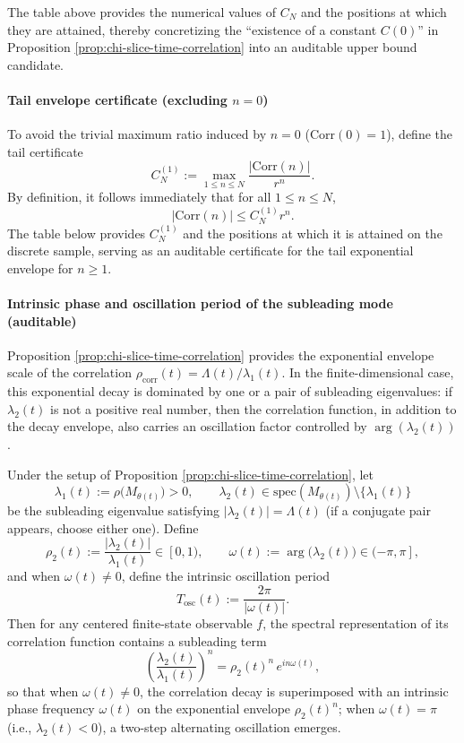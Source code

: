 \label{subsec:chi-ldp-part2}


The table above provides the numerical values of $C_N$ and the positions at which they are attained, thereby concretizing the ``existence of a constant $C(0)$'' in Proposition \ref{prop:chi-slice-time-correlation} into an auditable upper bound candidate.

\paragraph{Tail envelope certificate (excluding $n=0$)}
To avoid the trivial maximum ratio induced by $n=0$ ($\mathrm{Corr}(0)=1$), define the tail certificate
\[
C_N^{(1)}:=\max_{1\le n\le N}\frac{|\mathrm{Corr}(n)|}{r^n}.
\]
By definition, it follows immediately that for all $1\le n\le N$,
\[
|\mathrm{Corr}(n)|\le C_N^{(1)} r^n.
\]
The table below provides $C_N^{(1)}$ and the positions at which it is attained on the discrete sample, serving as an auditable certificate for the tail exponential envelope for $n\ge 1$.


\paragraph{Intrinsic phase and oscillation period of the subleading mode (auditable)}
Proposition \ref{prop:chi-slice-time-correlation} provides the exponential envelope scale of the correlation $\rho_{\mathrm{corr}}(t)=\Lambda(t)/\lambda_1(t)$. In the finite-dimensional case, this exponential decay is dominated by one or a pair of subleading eigenvalues: if $\lambda_2(t)$ is not a positive real number, then the correlation function, in addition to the decay envelope, also carries an oscillation factor controlled by $\arg(\lambda_2(t))$.

\begin{remark}
\label{prop:chi-slice-subleading-phase}
Under the setup of Proposition \ref{prop:chi-slice-time-correlation}, let
\[
\lambda_1(t):=\rho\bigl(M_{\theta(t)}\bigr)>0,
\qquad
\lambda_2(t)\in\mathrm{spec}(M_{\theta(t)})\setminus\{\lambda_1(t)\}
\]
be the subleading eigenvalue satisfying $|\lambda_2(t)|=\Lambda(t)$ (if a conjugate pair appears, choose either one). Define
\[
\rho_2(t):=\frac{|\lambda_2(t)|}{\lambda_1(t)}\in[0,1),
\qquad
\omega(t):=\arg\bigl(\lambda_2(t)\bigr)\in(-\pi,\pi],
\]
and when $\omega(t)\ne 0$, define the intrinsic oscillation period
\[
T_{\mathrm{osc}}(t):=\frac{2\pi}{|\omega(t)|}.
\]
Then for any centered finite-state observable $f$, the spectral representation of its correlation function contains a subleading term
\[
\left(\frac{\lambda_2(t)}{\lambda_1(t)}\right)^n
=\rho_2(t)^n\,e^{i n\omega(t)},
\]
so that when $\omega(t)\ne 0$, the correlation decay is superimposed with an intrinsic phase frequency $\omega(t)$ on the exponential envelope $\rho_2(t)^n$; when $\omega(t)=\pi$ (i.e., $\lambda_2(t)<0$), a two-step alternating oscillation emerges.
\end{remark}


